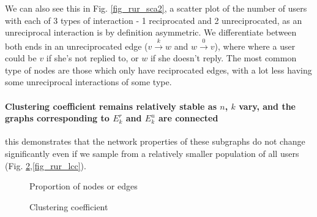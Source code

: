 \documentclass[conference]{IEEEtran}
\begin{document}
We can also see this in Fig. \ref{fig_rur_sca2}, a scatter plot of the number of users with each of 3 types of interaction - 1 reciprocated and 2 unreciprocated, as an unreciprocal interaction is by definition asymmetric. We differentiate between both ends in an unreciprocated edge ($v \xrightarrow{k} w$ and $w \xrightarrow{0} v$), where where a user could be $v$ if she's not replied to, or $w$ if she doesn't reply. The most common type of nodes are those which only have reciprocated edges, with a lot less having some unreciprocal interactions of some type.

\paragraph{Clustering coefficient remains relatively stable as $n$, $k$ vary, and the graphs corresponding to $E_k^r$ and $E_k^u$ are connected} this demonstrates that the network properties of these subgraphs do not change significantly even if we sample from a relatively smaller population of all users (Fig. \ref{fig_rur_cc},\ref{fig_rur_lcc}).

\begin{figure}[!t]
\centering
{}                
\caption{Proportion of nodes or edges}
\label{fig_rur_propne}
\end{figure}

\begin{figure}[!t]
\centering
{}                
\caption{Clustering coefficient}
\label{fig_rur_cc}
\end{figure}
\end{document}
